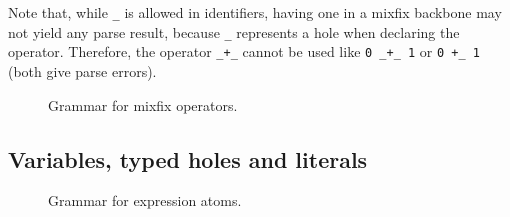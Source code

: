 Note that, while \verb|_| is allowed in identifiers, having one in a mixfix backbone may not yield any parse result, because \verb|_| represents a hole when declaring the operator.
Therefore, the operator \verb|_+_| cannot be used like \verb|0 _+_ 1| or \verb|0 +_ 1| (both give parse errors).

\begin{figure}[H]
  \centering


  \caption{Grammar for mixfix operators.}
  \label{fig:zilch-grammar-expressions-mxifix-grammar}
\end{figure}

\subsection{Variables, typed holes and literals}\label{subsec:zilch-grammar-expressions-basicexpr}

\begin{figure}[H]
  \centering


  \caption{Grammar for expression atoms.}
  \label{fig:zilch-grammar-expressions-atom-grammar}
\end{figure}


